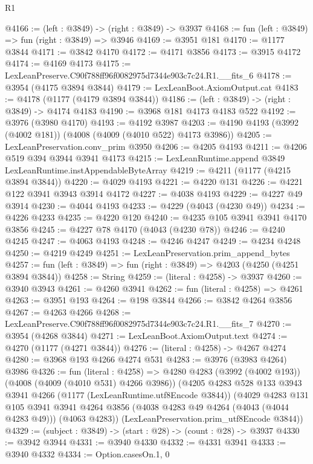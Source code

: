 \begin{lexlean}{R1}
\begin{coremodule}
@4166 := (left : @3849) -> (right : @3849) -> @3937
@4168 := fun (left : @3849) => fun (right : @3849) => @3946
@4169 := @3951 @181
@4170 := @1177 @3844
@4171 := @3842 @4170
@4172 := @4171 @3856
@4173 := @3915 @4172
@4174 := @4169 @4173
@4175 := LexLeanPreserve.C90f788ff96f0082975d7344e903c7c24.R1.__fits_6
@4178 := @3954 (@4175 @3894 @3844)
@4179 := LexLeanBoot.AxiomOutput.cat
@4183 := @4178 (@1177 (@4179 @3894 @3844))
@4186 := (left : @3849) -> (right : @3849) -> @4174 @4183
@4190 := @3968 @181 @4173 @4183 @522
@4192 := @3976 (@3980 @4170)
@4193 := @4192 @3987
@4203 := @4190 @4193 (@3992 (@4002 @181)) (@4008 (@4009 (@4010 @522) @4173 @3986))
@4205 := LexLeanPreservation.conv_prim @3950
@4206 := @4205 @4193
@4211 := @4206 @519 @394 @3944 @3941 @4173
@4215 := LexLeanRuntime.append @3849 LexLeanRuntime.instAppendableByteArray
@4219 := @4211 (@1177 (@4215 @3894 @3844))
@4220 := @4029 @4193
@4221 := @4220 @131
@4226 := @4221 @122 @3941 @3943 @3914 @4172
@4227 := @4038 @4193
@4229 := @4227 @49 @3914
@4230 := @4044 @4193
@4233 := @4229 (@4043 (@4230 @49))
@4234 := @4226 @4233
@4235 := @4220 @120
@4240 := @4235 @105 @3941 @3941 @4170 @3856
@4245 := @4227 @78 @4170 (@4043 (@4230 @78))
@4246 := @4240 @4245
@4247 := @4063 @4193
@4248 := @4246 @4247
@4249 := @4234 @4248
@4250 := @4219 @4249
@4251 := LexLeanPreservation.prim_append_bytes
@4257 := fun (left : @3849) => fun (right : @3849) => @4203 (@4250 (@4251 @3894 @3844))
@4258 := String
@4259 := (literal : @4258) -> @3937
@4260 := @3940 @3943
@4261 := @4260 @3941
@4262 := fun (literal : @4258) => @4261
@4263 := @3951 @193
@4264 := @198 @3844
@4266 := @3842 @4264 @3856
@4267 := @4263 @4266
@4268 := LexLeanPreserve.C90f788ff96f0082975d7344e903c7c24.R1.__fits_7
@4270 := @3954 (@4268 @3844)
@4271 := LexLeanBoot.AxiomOutput.text
@4274 := @4270 (@1177 (@4271 @3844))
@4276 := (literal : @4258) -> @4267 @4274
@4280 := @3968 @193 @4266 @4274 @531
@4283 := @3976 (@3983 @4264) @3986
@4326 := fun (literal : @4258) =>
  @4280
    @4283
    (@3992 (@4002 @193))
    (@4008 (@4009 (@4010 @531) @4266 @3986))
    (@4205
      @4283
      @528
      @133
      @3943
      @3941
      @4266
      (@1177 (LexLeanRuntime.utf8Encode @3844))
      (@4029
        @4283
        @131
        @105
        @3941
        @3941
        @4264
        @3856
        (@4038 @4283 @49 @4264 (@4043 (@4044 @4283 @49)))
        (@4063 @4283))
      (LexLeanPreservation.prim_utf8Encode @3844))
@4329 := (subject : @3849) -> (start : @28) -> (count : @28) -> @3937
@4330 := @3942 @3944
@4331 := @3940 @4330
@4332 := @4331 @3941
@4333 := @3940 @4332
@4334 := Option.casesOn.{1, 0}

\end{coremodule}
\end{lexlean}
